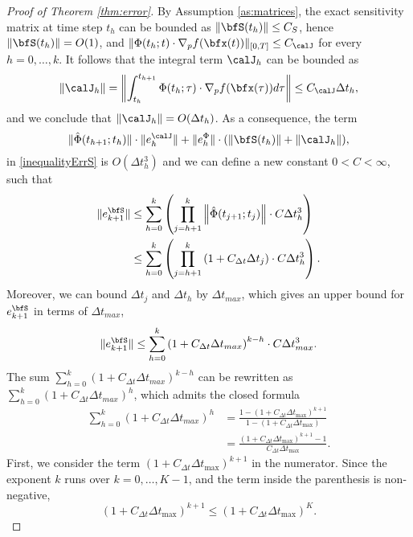 \documentclass[DIV=12]{scrartcl} %
\newcommand{\err}{\ensuremath{e}}
\theoremstyle{definition}
\begin{document}
\begin{proof}[Proof of Theorem \ref{thm:error}]
By Assumption \ref{as:matrices}, the exact sensitivity matrix at time step $t_h$ can be bounded as $\|\bfS(t_h)\|\le C_S$, hence $\|\bfS(t_h)\|=O(1)$, and $\|\Phi(t_h;t)\cdot\nabla_pf(\bfx(t))\|_{[0,T]}\le C_{\calJ}$ for every $h=0,\dots,k$. It follows that the integral term $\calJ_h$ can be bounded as
\[
\|\calJ_h\| = \left\|\int_{t_h}^{t_{h+1}}\Phi(t_h;\tau)\cdot\nabla_pf(\bfx(\tau))d\tau\right\|\le C_{\calJ}\Delta t_h,
\]
and we conclude that $\|\calJ_h\|=O(\Delta t_h)$.
As a consequence, the term 
\[
\|\hat{\Phi}(t_{h+1};t_h)\|\cdot \|\err_h^{\calJ}\|+\|\err_h^\Phi\|\cdot(\|\bfS(t_h)\|+\|\calJ_h\|),
\]
in \eqref{inequalityErrS} is $O(\Delta t_h^3)$ and we can define a new constant $0<C<\infty$, 
such that
\begin{align*}
\|\err_{k+1}^\bfS\|& \le\sum_{h=0}^k\left(\prod_{j=h+1}^k\left\|\hat{\Phi}(t_{j+1};t_j)\right\|\cdot C\Delta t_h^3\right) \\
&\le\sum_{h=0}^k\left(\prod_{j=h+1}^k\left(1 + C_{\Delta t}\Delta t_j\right)\cdot C\Delta t_h^3\right).
\end{align*}
Moreover, we can bound $\Delta t_j$ and $\Delta t_h$ by $\Delta t_{max}$, which gives an upper bound for $\err_{k+1}^\bfS$ in terms of $\Delta t_{max}$,
\[
\|\err_{k+1}^\bfS\|\le\sum_{h=0}^k\left(1 +C_{\Delta t} \Delta t_{max}\right)^{k-h}\cdot C\Delta t_{max}^3.
\]
The sum $\sum_{h=0}^k\left(1 + C_{\Delta t}\Delta t_{max}\right)^{k-h}$ can be rewritten as $\sum_{h=0}^k\left(1 + C_{\Delta t}\Delta t_{max}\right)^{h}$, which admits the closed formula
\begin{align}
    \sum_{h=0}^k\left(1 + C_{\Delta t}\Delta t_{max}\right)^{h} &= \frac{1-\left(1 + C_{\Delta t}\Delta t_{\max}\right)^{k+1}}{1-\left(1 +C_{\Delta t} \Delta t_{\max}\right)} \nonumber\\
    &=\frac{\left(1 + C_{\Delta t}\Delta t_{\max}\right)^{k+1}-1}{C_{\Delta t} \Delta t_{\max}}. \label{geomSum}
\end{align}
First, we consider the term $\left(1 + C_{\Delta t}\Delta t_{\max}\right)^{k+1}$ in the numerator. Since the exponent $k$ runs over $k=0,\dots,K-1$, and the term inside the parenthesis is non-negative, 
\begin{equation}
\label{inequalityExp}
\left(1 + C_{\Delta t}\Delta t_{\max}\right)^{k+1}\le \left(1 + C_{\Delta t}\Delta t_{\max}\right)^K.
\end{equation}


\end{proof}
\end{document}
